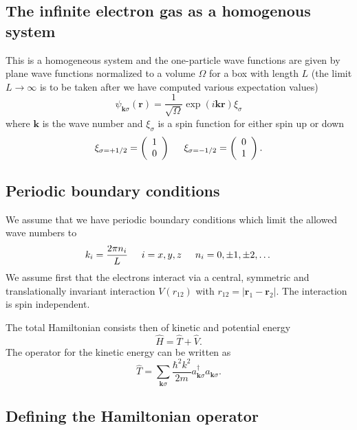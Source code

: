 \documentclass[graybox,sectrefs,envcountresetchap,open=right]{svmonodo}
\begin{document}
\subsection{The infinite electron gas as a homogenous system}

This is a homogeneous system and the one-particle wave functions are given by plane wave functions normalized to a volume $\Omega$ 
for a box with length $L$ (the limit $L\rightarrow \infty$ is to be taken after we have computed various expectation values)
\[
\psi_{\mathbf{k}\sigma}(\mathbf{r})= \frac{1}{\sqrt{\Omega}}\exp{(i\mathbf{kr})}\xi_{\sigma}
\]
where $\mathbf{k}$ is the wave number and  $\xi_{\sigma}$ is a spin function for either spin up or down
\[ 
\xi_{\sigma=+1/2}=\left(\begin{array}{c} 1 \\ 0 \end{array}\right) \hspace{0.5cm}
\xi_{\sigma=-1/2}=\left(\begin{array}{c} 0 \\ 1 \end{array}\right).
\]




\subsection{Periodic boundary conditions}


We assume that we have periodic boundary conditions which limit the allowed wave numbers to
\[
k_i=\frac{2\pi n_i}{L}\hspace{0.5cm} i=x,y,z \hspace{0.5cm} n_i=0,\pm 1,\pm 2, \dots
\]
We assume first that the electrons interact via a central, symmetric and translationally invariant
interaction  $V(r_{12})$ with
$r_{12}=|\mathbf{r}_1-\mathbf{r}_2|$.  The interaction is spin independent.

The total Hamiltonian consists then of kinetic and potential energy
\[
\hat{H} = \hat{T}+\hat{V}.
\]
The operator for the kinetic energy can be written as
\[
\hat{T}=\sum_{\mathbf{k}\sigma}\frac{\hbar^2k^2}{2m}a_{\mathbf{k}\sigma}^{\dagger}a_{\mathbf{k}\sigma}.
\]



\subsection{Defining the Hamiltonian operator}
\end{document}
